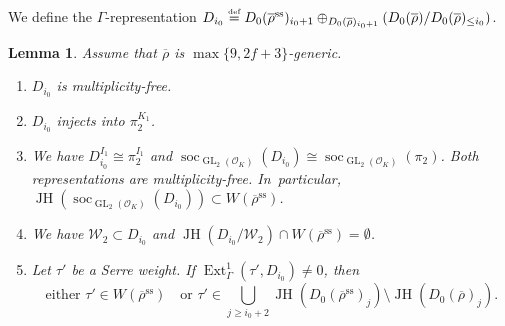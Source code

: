 \documentclass[JEP,XML,SOM,Unicode,NoFloatCountersInSection, NoEqCountersInSection,published]{cedram}
\let\backslash\setminus
\newcommand{\defeq}{\stackrel{\textrm{\tiny{\upshape{def}}}}{=}}
\newcommand{\cO}{\mathcal{O}}
\renewcommand{\ss}{\mathrm{ss}}
\newcommand{\brho}{\overline{\rho}}
\DeclareMathOperator{\Ext}{Ext}
\DeclareMathOperator{\GL}{GL}
\DeclareMathOperator{\JH}{\mathrm{JH}}
\DeclareMathOperator{\soc}{soc}
\theoremstyle{plain}
\newtheorem{lem}[prop]{Lemma}
\theoremstyle{definition}
\begin{document}
We define the $\Gamma$-representation $D_{i_0} \defeq D_0(\brho^\ss)_{i_0+1} \oplus_{D_0(\brho)_{i_0+1}} (D_0(\brho)/D_0(\brho)_{\le i_0})$.

\begin{lem}\label{lem:Ext-Di0}
Assume that $\brho$ is $\max\{9,2f+3\}$-generic.
\begin{enumerate}
\item
\label{it:lem:Ext-Di0:1}
$D_{i_0}$ is multiplicity-free.
\item
\label{it:lem:Ext-Di0:2}
$D_{i_0}$ injects into $\pi_2^{K_1}$.
\item
\label{it:lem:Ext-Di0:3}
We have $D_{i_0}^{I_1} \cong \pi_2^{I_1}$ and $\soc_{\GL_2(\cO_K)}(D_{i_0}) \cong \soc_{\GL_2(\cO_K)}(\pi_2)$.
Both representations are multiplicity-free. In~particular, $\JH(\soc_{\GL_2(\cO_K)}(D_{i_0}))\subset W(\brho^\ss)$.
\item
\label{it:lem:Ext-Di0:4}
We have $\mathcal{W}_2 \subset D_{i_0}$ and $\JH(D_{i_0}/\mathcal{W}_2) \cap W(\brho^\ss) = \emptyset$.
\item
\label{it:lem:Ext-Di0:5}
Let $\tau'$ be a Serre weight. If $\Ext^1_{\Gamma}(\tau',D_{i_0})\neq 0$, then
\[
\text{either }\tau'\in W(\brho^\ss)
\quad\text{or }
\tau'\in \bigcup_{j\geq i_0+2}\JH(D_0(\brho^\ss)_j)\backslash \JH(D_0(\brho)_j).
\]
\end{enumerate}
\end{lem}
\end{document}
